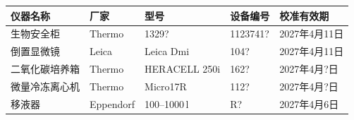 \documentclass[UTF8,10pt,a4paper,fontset=fandol]{ctexart}
\newcommand{\fieldvalue}[1]{#1}
\newcommand{\handwritten}[1]{#1}
\begin{document}
\begin{tabular}{|p{2.5cm}|p{1.5cm}|p{2.8cm}|p{2.2cm}|p{2.8cm}|}
\hline
仪器名称 & 厂家 & 型号 & 设备编号 & 校准有效期\\
\hline
\fieldvalue{生物安全柜} &
\fieldvalue{Thermo} &
\fieldvalue{\handwritten{1329?}} &
\fieldvalue{\handwritten{1123741?}} &
\fieldvalue{\handwritten{2027年4月11日}}\\
\hline
\fieldvalue{倒置显微镜} &
\fieldvalue{Leica} &
\fieldvalue{Leica Dmi} &
\fieldvalue{\handwritten{104?}} &
\fieldvalue{\handwritten{2027年4月11日}}\\
\hline
\fieldvalue{二氧化碳培养箱} &
\fieldvalue{Thermo} &
\fieldvalue{HERACELL 250i} &
\fieldvalue{\handwritten{162?}} &
\fieldvalue{\handwritten{2027年4月?日}}\\
\hline
\fieldvalue{微量冷冻离心机} &
\fieldvalue{Thermo} &
\fieldvalue{Micro17R} &
\fieldvalue{\handwritten{112?}} &
\fieldvalue{\handwritten{2027年4月?日}}\\
\hline
\fieldvalue{移液器} &
\fieldvalue{Eppendorf} &
\fieldvalue{\handwritten{100--1000\,\textmu l}} &
\fieldvalue{\handwritten{R?}} &
\fieldvalue{\handwritten{2027年4月6日}}\\
\hline
\end{tabular}
\end{document}
